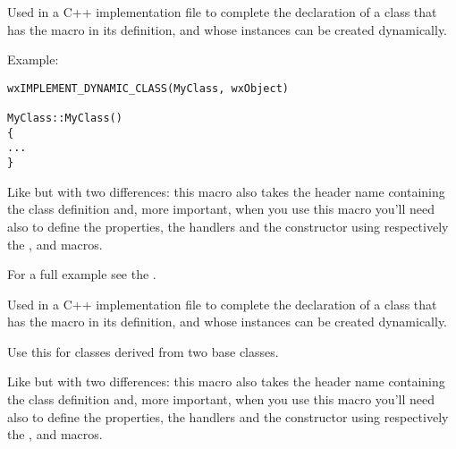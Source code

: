 Used in a C++ implementation file to complete the declaration of
a class that has the
macro in its definition, and whose instances can be created dynamically.

Example:

\begin{verbatim}
wxIMPLEMENT_DYNAMIC_CLASS(MyClass, wxObject)

MyClass::MyClass()
{
...
}
\end{verbatim}


\label{wximplementdynamicclassxti}


Like  but with two
differences: this macro also takes the header name containing the class definition and,
more important, when you use this macro you'll need also to define the properties, the
handlers and the constructor using respectively the
,  and
 macros.

For a full example see the .


\label{wximplementdynamicclass2}


Used in a C++ implementation file to complete the declaration of
a class that has the
macro in its definition, and whose instances can be created dynamically. 

Use this for classes derived from two base classes.


\label{wximplementdynamicclass2xti}


Like  but with two
differences: this macro also takes the header name containing the class definition and,
more important, when you use this macro you'll need also to define the properties, the
handlers and the constructor using respectively the
,  and
 macros.

